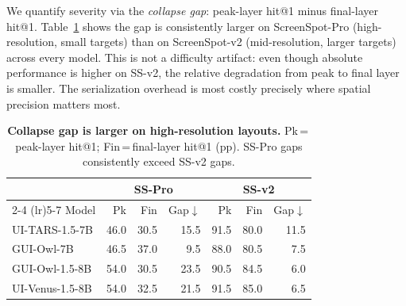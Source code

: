 We quantify severity via the \emph{collapse gap}: peak-layer hit@1 minus final-layer hit@1.
Table~\ref{tab:resolution_comparison} shows the gap is consistently larger on ScreenSpot-Pro (high-resolution, small targets) than on ScreenSpot-v2 (mid-resolution, larger targets) across every model.
This is not a difficulty artifact: even though absolute performance is higher on SS-v2, the relative degradation from peak to final layer is smaller.
The serialization overhead is most costly precisely where spatial precision matters most.

\begin{table}[t]
\centering
\small
\setlength{\tabcolsep}{4pt}
\begin{tabular}{lrrr@{\hspace{0.8em}}rrr}
\toprule
& \multicolumn{3}{c}{SS-Pro} & \multicolumn{3}{c}{SS-v2} \\
\cmidrule(lr){2-4} \cmidrule(lr){5-7}
Model & Pk & Fin & Gap$\downarrow$ & Pk & Fin & Gap$\downarrow$ \\
\midrule
UI-TARS-1.5-7B    & 46.0 & 30.5 & 15.5 & 91.5 & 80.0 & 11.5 \\
GUI-Owl-7B        & 46.5 & 37.0 &  9.5 & 88.0 & 80.5 &  7.5 \\
GUI-Owl-1.5-8B    & 54.0 & 30.5 & 23.5 & 90.5 & 84.5 &  6.0 \\
UI-Venus-1.5-8B   & 54.0 & 32.5 & 21.5 & 91.5 & 85.0 &  6.5 \\
\bottomrule
\end{tabular}
\caption{
  \textbf{Collapse gap is larger on high-resolution layouts.}
  Pk\,=\,peak-layer hit@1; Fin\,=\,final-layer hit@1 (pp).
  SS-Pro gaps consistently exceed SS-v2 gaps.
}
\label{tab:resolution_comparison}
\end{table}

